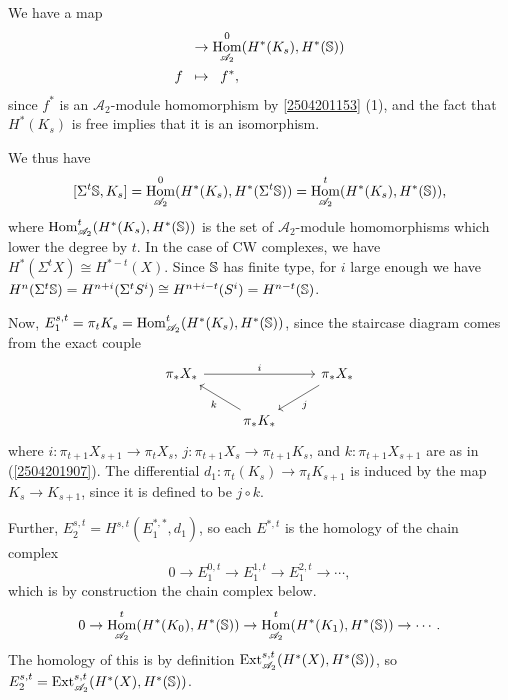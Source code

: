 \documentclass{MetricNotes2023}
\def\bb{\ensuremath\mathbb}
\def\A{\ensuremath{\mathscr{A}_2}}
\DeclareMathOperator{\Ext}{Ext}
\DeclareMathOperator{\Hom}{Hom}
\def\textcolour{\textcolor}
\begin{document}
We have a map 
\begin{align*}
[\bb{S}, K_s]&\to \Hom_{\A}^0(H^*(K_s), H^*(\bb{S}))\\
f \;\;&\mapsto\;\; f^*,
\end{align*}
since \(f^*\) is an \(\A\)-module homomorphism by \ref{2504201153} (1), and the fact that \(H^*(K_s)\) is free implies that it is an isomorphism.

We thus have
\[[\Sigma^t \bb{S}, K_s]=\Hom^0_{\A}(H^*(K_s), H^*(\Sigma^t \bb{S}))=\Hom^t_{\A}(H^*(K_s), H^*(\bb{S})),\]
where \(\Hom^t_{\A}(H^*(K_s), H^*(\bb{S}))\) is the set of \(\A\)-module homomorphisms which lower the degree by \(t\). In the case of CW complexes, we have \(H^*(\Sigma^t X)\cong H^{*-t}(X)\). Since \(\bb{S}\) has finite type, for \(i\) large enough we have \(H^n(\Sigma^t\bb{S})=H^{n+i}(\Sigma^t S^i)\cong H^{n+i-t}(S^i)=H^{n-t}(\bb{S})\).

Now, \(E_1^{s,t} = \pi_t K_s =\Hom^t_{\A}(H^*(K_s), H^*(\bb{S}))\), since the staircase diagram comes from %
the exact couple
\[\begin{tikzcd}
 \pi_*X_* \arrow[rr, "i"] & & \pi_* X_* \arrow[dl, "j"] \\ 
 & \pi_*K_* \arrow[ul, "k"] & 
 \end{tikzcd}\]
where \(i : \pi_{t+1}X_{s+1}\to \pi_tX_s\), \(j : \pi_{t+1}X_s \to \pi_{t+1}K_s\), and \(k : \pi_{t+1}X_{s+1}\) are as in (\ref{2504201907}). The differential \(d_1 : \pi_t(K_s)\to\pi_t K_{s+1}\) is induced by the map \(K_s \to K_{s+1}\), since it is defined to be \(j\circ k\).

Further, \(E^{s,t}_2=H^{s,t}(E_1^{*,*}, d_1)\), so each \(E^{*, t}\) is the homology of the chain complex
\[0 \to E^{0,t}_1 \to E^{1,t}_1\to E^{2,t}_1\to \cdots,\]
which is by construction the chain complex below.
\[0 \to \Hom^t_{\A}(H^*(K_0), H^*(\bb{S}))\to \Hom^t_{\A}(H^*(K_1), H^*(\bb{S}))\to \cdots.\]
The homology of this is by definition \(\Ext_{\A}^{s,t}(H^*(X), H^*(\bb{S}))\), so \(E_2^{s,t}=\Ext^{s,t}_{\A}(H^*(X), H^*(\bb{S}))\).
\end{document}
